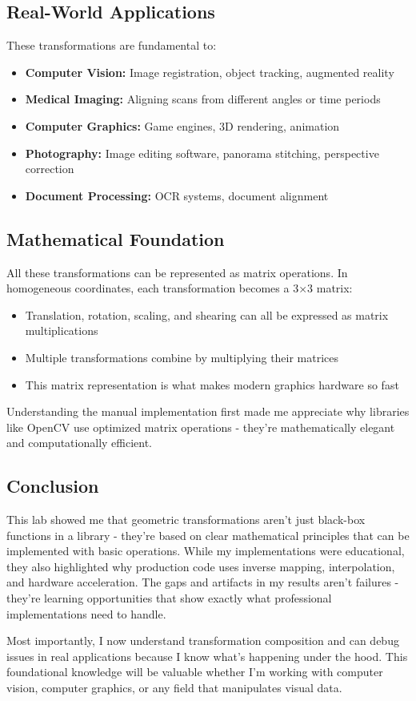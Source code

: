 \documentclass[12pt,a4paper]{report}
\begin{document}
\subsection*{Real-World Applications}

These transformations are fundamental to:
\begin{itemize}
    \item \textbf{Computer Vision:} Image registration, object tracking, augmented reality
    \item \textbf{Medical Imaging:} Aligning scans from different angles or time periods
    \item \textbf{Computer Graphics:} Game engines, 3D rendering, animation
    \item \textbf{Photography:} Image editing software, panorama stitching, perspective correction
    \item \textbf{Document Processing:} OCR systems, document alignment
\end{itemize}

\subsection*{Mathematical Foundation}

All these transformations can be represented as matrix operations. In homogeneous coordinates, each transformation becomes a 3×3 matrix:

\begin{itemize}
    \item Translation, rotation, scaling, and shearing can all be expressed as matrix multiplications
    \item Multiple transformations combine by multiplying their matrices
    \item This matrix representation is what makes modern graphics hardware so fast
\end{itemize}

Understanding the manual implementation first made me appreciate why libraries like OpenCV use optimized matrix operations - they're mathematically elegant and computationally efficient.

\subsection*{Conclusion}

This lab showed me that geometric transformations aren't just black-box functions in a library - they're based on clear mathematical principles that can be implemented with basic operations. While my implementations were educational, they also highlighted why production code uses inverse mapping, interpolation, and hardware acceleration. The gaps and artifacts in my results aren't failures - they're learning opportunities that show exactly what professional implementations need to handle.

Most importantly, I now understand transformation composition and can debug issues in real applications because I know what's happening under the hood. This foundational knowledge will be valuable whether I'm working with computer vision, computer graphics, or any field that manipulates visual data.
\end{document}
